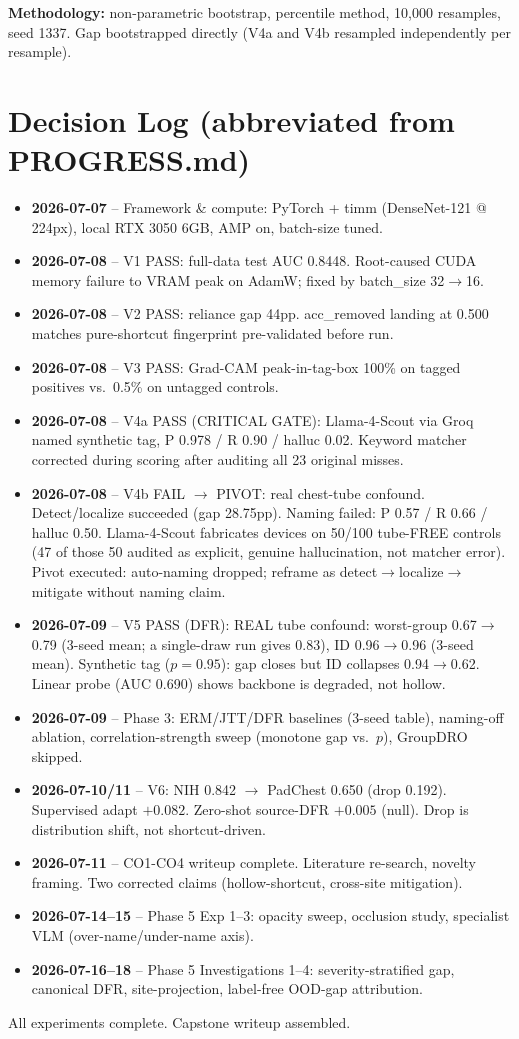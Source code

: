 \documentclass{ieeeaccess}
\begin{document}
\textbf{Methodology:} non-parametric bootstrap, percentile method, 10,000
resamples, seed 1337. Gap bootstrapped directly (V4a and V4b resampled
independently per resample).

\section{Decision Log (abbreviated from PROGRESS.md)}
\begin{itemize}
\item \textbf{2026-07-07} -- Framework \& compute: PyTorch + timm
(DenseNet-121 @ 224px), local RTX 3050 6GB, AMP on, batch-size tuned.
\item \textbf{2026-07-08} -- V1 PASS: full-data test AUC 0.8448. Root-caused
CUDA memory failure to VRAM peak on AdamW; fixed by batch\_size 32$\to$16.
\item \textbf{2026-07-08} -- V2 PASS: reliance gap 44pp. acc\_removed landing
at 0.500 matches pure-shortcut fingerprint pre-validated before run.
\item \textbf{2026-07-08} -- V3 PASS: Grad-CAM peak-in-tag-box 100\% on
tagged positives vs.\ 0.5\% on untagged controls.
\item \textbf{2026-07-08} -- V4a PASS (CRITICAL GATE): Llama-4-Scout via Groq
named synthetic tag, P 0.978 / R 0.90 / halluc 0.02. Keyword matcher
corrected during scoring after auditing all 23 original misses.
\item \textbf{2026-07-08} -- V4b FAIL $\to$ PIVOT: real chest-tube confound.
Detect/localize succeeded (gap 28.75pp). Naming failed: P 0.57 / R 0.66 /
halluc 0.50. Llama-4-Scout fabricates devices on 50/100 tube-FREE controls
(47 of those 50 audited as explicit, genuine hallucination, not matcher
error). Pivot executed: auto-naming dropped; reframe as
detect$\to$localize$\to$mitigate without naming claim.
\item \textbf{2026-07-09} -- V5 PASS (DFR): REAL tube confound: worst-group
0.67$\to$0.79 (3-seed mean; a single-draw run gives 0.83), ID
0.96$\to$0.96 (3-seed mean). Synthetic tag ($p=0.95$): gap closes but ID
collapses 0.94$\to$0.62. Linear probe (AUC 0.690) shows backbone is
degraded, not hollow.
\item \textbf{2026-07-09} -- Phase 3: ERM/JTT/DFR baselines (3-seed table),
naming-off ablation, correlation-strength sweep (monotone gap vs.\ $p$),
GroupDRO skipped.
\item \textbf{2026-07-10/11} -- V6: NIH 0.842 $\to$ PadChest 0.650 (drop
0.192). Supervised adapt $+0.082$. Zero-shot source-DFR $+0.005$ (null).
Drop is distribution shift, not shortcut-driven.
\item \textbf{2026-07-11} -- CO1-CO4 writeup complete. Literature re-search,
novelty framing. Two corrected claims (hollow-shortcut, cross-site
mitigation).
\item \textbf{2026-07-14--15} -- Phase 5 Exp 1--3: opacity sweep, occlusion
study, specialist VLM (over-name/under-name axis).
\item \textbf{2026-07-16--18} -- Phase 5 Investigations 1--4:
severity-stratified gap, canonical DFR, site-projection, label-free
OOD-gap attribution.
\end{itemize}
All experiments complete. Capstone writeup assembled.
\end{document}
